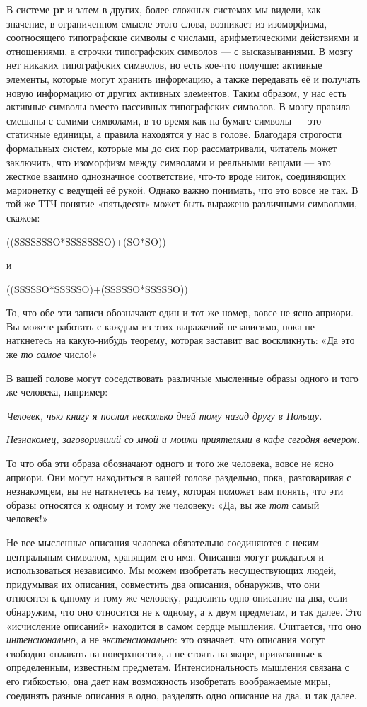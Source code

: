 \documentclass[../main.tex]{subfiles}
\begin{document}
В системе \textbf{pr} и затем в других, более сложных системах мы видели, как значение, в ограниченном смысле этого слова, возникает из изоморфизма, соотносящего типографские символы с числами, арифметическими действиями и отношениями, а строчки типографских символов --- с высказываниями. В мозгу нет никаких типографских символов, но есть кое-что получше: активные элементы, которые могут хранить информацию, а также передавать её и получать новую информацию от других активных элементов. Таким образом, у нас есть активные символы вместо пассивных типографских символов. В мозгу правила смешаны с самими символами, в то время как на бумаге символы --- это статичные единицы, а правила находятся у нас в голове. Благодаря строгости формальных систем, которые мы до сих пор рассматривали, читатель может заключить, что изоморфизм между символами и реальными вещами --- это жесткое взаимно однозначное соответствие, что-то вроде ниток, соединяющих марионетку с ведущей её рукой. Однако важно понимать, что это вовсе не так. В той же ТТЧ понятие «пятьдесят» может быть выражено различными символами, скажем:

((SSSSSSSO*SSSSSSSO)+(SO*SO))

и

((SSSSSO*SSSSSO)+(SSSSSO*SSSSSO))

То, что обе эти записи обозначают один и тот же номер, вовсе не ясно априори. Вы можете работать с каждым из этих выражений независимо, пока не наткнетесь на какую-нибудь теорему, которая заставит вас воскликнуть: «Да это же \emph{то самое} число!»

В вашей голове могут соседствовать различные мысленные образы одного и того же человека, например:

\emph{Человек, чью книгу я послал несколько дней тому назад другу в Польшу.}

\emph{Незнакомец, заговоривший со мной и моими приятелями в кафе сегодня вечером.}

То что оба эти образа обозначают одного и того же человека, вовсе не ясно априори. Они могут находиться в вашей голове раздельно, пока, разговаривая с незнакомцем, вы не наткнетесь на тему, которая поможет вам понять, что эти образы относятся к одному и тому же человеку: «Да, вы же \emph{тот} самый человек!»

Не все мысленные описания человека обязательно соединяются с неким центральным символом, хранящим его имя. Описания могут рождаться и использоваться независимо. Мы можем изобретать несуществующих людей, придумывая их описания, совместить два описания, обнаружив, что они относятся к одному и тому же человеку, разделить одно описание на два, если обнаружим, что оно относится не к одному, а к двум предметам, и так далее. Это «исчисление описаний» находится в самом сердце мышления. Считается, что оно \emph{интенсионально}, а не \emph{экстенсионально}: это означает, что описания могут свободно «плавать на поверхности», а не стоять на якоре, привязанные к определенным, известным предметам. Интенсиональность мышления связана с его гибкостью, она дает нам возможность изобретать воображаемые миры, соединять разные описания в одно, разделять одно описание на два, и так далее.
\end{document}
